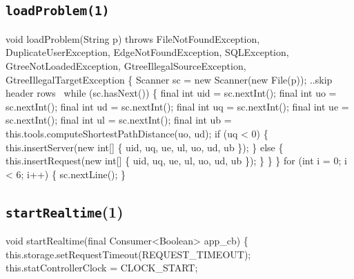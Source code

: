 \subsection{\texttt{loadProblem(1)}}
\nwenddocs{}\endmoddef{}
void loadProblem(String p)
throws FileNotFoundException, DuplicateUserException, EdgeNotFoundException, SQLException,
       GtreeNotLoadedException, GtreeIllegalSourceException, GtreeIllegalTargetException \{
  Scanner sc = new Scanner(new File(p));
  \LA{}..skip header rows~{\nwtagstyle{}}\RA{}
  while (sc.hasNext()) \{
    final int uid = sc.nextInt();
    final int  uo = sc.nextInt();
    final int  ud = sc.nextInt();
    final int  uq = sc.nextInt();
    final int  ue = sc.nextInt();
    final int  ul = sc.nextInt();
    final int  ub = this.tools.computeShortestPathDistance(uo, ud);
    if (uq < 0) \{
      this.insertServer(new int[] \{ uid, uq, ue, ul, uo, ud, ub \});
    \} else \{
      this.insertRequest(new int[] \{ uid, uq, ue, ul, uo, ud, ub \});
    \}
  \}
\}
\eatline
{}\nwendcode{}\endmoddef{}
for (int i = 0; i < 6; i++) \{
  sc.nextLine();
\}
\nwendcode{}\nwdocspar

\subsection{\texttt{startRealtime}(1)}
\nwenddocs{}\endmoddef{}
void startRealtime(final Consumer<Boolean> app_cb) \{
  this.storage.setRequestTimeout(REQUEST_TIMEOUT);
  this.statControllerClock = CLOCK_START;

